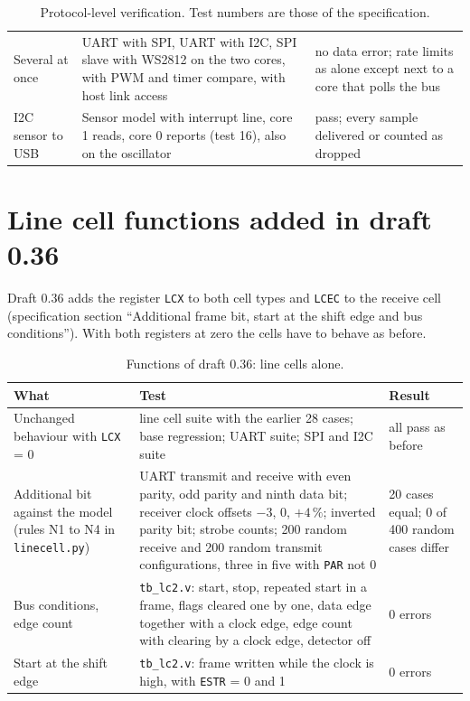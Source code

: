 \documentclass[10pt,a4paper]{article}
\begin{document}
\begin{table}[H]
\begin{tabularx}{\linewidth}{@{}lLL@{}}
Several at once & UART with SPI, UART with I2C, SPI slave with WS2812 on the two cores, with PWM and timer compare, with host link access & no data error; rate limits as alone except next to a core that polls the bus \\
I2C sensor to USB & Sensor model with interrupt line, core 1 reads, core 0 reports (test 16), also on the oscillator & pass; every sample delivered or counted as dropped \\
\bottomrule
\end{tabularx}
\caption{Protocol-level verification. Test numbers are those of the specification.}
\end{table}

\section{Line cell functions added in draft 0.36}\label{sec:v036}

Draft 0.36 adds the register \texttt{LCX} to both cell types and \texttt{LCEC} to the receive cell
(specification section ``Additional frame bit, start at the shift edge and bus conditions''). With both
registers at zero the cells have to behave as before.

\begin{table}[H]
\centering\small
\begin{tabularx}{\linewidth}{@{}LLL@{}}
\toprule
What & Test & Result \\
\midrule
Unchanged behaviour with \texttt{LCX} = 0 & line cell suite with the earlier 28 cases; base regression; UART suite; SPI and I2C suite & all pass as before \\
Additional bit against the model (rules N1 to N4 in \texttt{linecell.py}) & UART transmit and receive with even parity, odd parity and ninth data bit; receiver clock offsets $-3$, 0, $+4\,\%$; inverted parity bit; strobe counts; 200 random receive and 200 random transmit configurations, three in five with \texttt{PAR} not 0 & 20 cases equal; 0 of 400 random cases differ \\
Bus conditions, edge count & \texttt{tb\_lc2.v}: start, stop, repeated start in a frame, flags cleared one by one, data edge together with a clock edge, edge count with clearing by a clock edge, detector off & 0 errors \\
Start at the shift edge & \texttt{tb\_lc2.v}: frame written while the clock is high, with \texttt{ESTR} = 0 and 1 & 0 errors \\
\bottomrule
\end{tabularx}
\caption{Functions of draft 0.36: line cells alone.}
\end{table}
\end{document}
